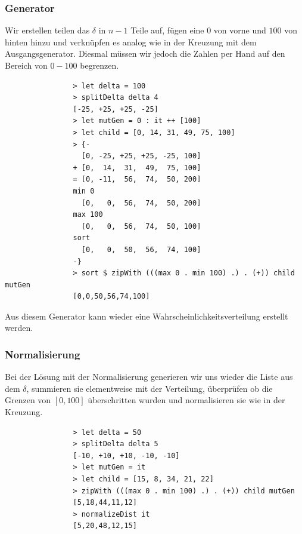             \subsubsection*{Generator}

            Wir erstellen teilen das $\delta$ in $n-1$ Teile auf, fügen eine $0$ von vorne und $100$ von hinten hinzu und verknüpfen es analog wie in der Kreuzung mit dem Ausgangsgenerator. Diesmal müssen wir jedoch die Zahlen per Hand auf den Bereich von $0 - 100$ begrenzen.

            \begin{verbatim}
                > let delta = 100
                > splitDelta delta 4
                [-25, +25, +25, -25]
                > let mutGen = 0 : it ++ [100]
                > let child = [0, 14, 31, 49, 75, 100]
                > {-
                  [0, -25, +25, +25, -25, 100]
                + [0,  14,  31,  49,  75, 100]
                = [0, -11,  56,  74,  50, 200]
                min 0
                  [0,   0,  56,  74,  50, 200]
                max 100
                  [0,   0,  56,  74,  50, 100]
                sort
                  [0,   0,  50,  56,  74, 100]
                -}
                > sort $ zipWith (((max 0 . min 100) .) . (+)) child mutGen
                [0,0,50,56,74,100]
            \end{verbatim}

            Aus diesem Generator kann wieder eine Wahrscheinlichkeitsverteilung erstellt werden.

            \subsubsection*{Normalisierung}

            Bei der Lösung mit der Normalisierung generieren wir uns wieder die Liste aus dem $\delta$, summieren sie elementweise mit der Verteilung, überprüfen ob die Grenzen von $[0,100]$ überschritten wurden und normalisieren sie wie in der Kreuzung.

            \begin{verbatim}
                > let delta = 50
                > splitDelta delta 5
                [-10, +10, +10, -10, -10]
                > let mutGen = it
                > let child = [15, 8, 34, 21, 22]
                > zipWith (((max 0 . min 100) .) . (+)) child mutGen
                [5,18,44,11,12]
                > normalizeDist it
                [5,20,48,12,15]
            \end{verbatim}

